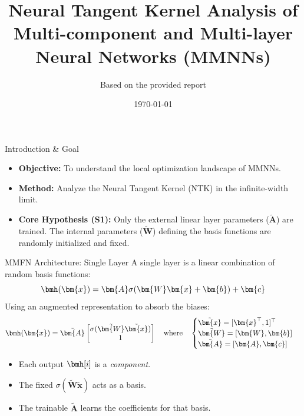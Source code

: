 \documentclass{beamer}
\title{Neural Tangent Kernel Analysis of Multi-component and Multi-layer Neural Networks (MMNNs)}
\author{Based on the provided report}
\date{\today}
\begin{document}
\begin{frame}
\titlepage
\end{frame}

\begin{frame}{Introduction \& Goal}
\begin{itemize}
    \item \textbf{Objective:} To understand the local optimization landscape of MMNNs.
    \item \textbf{Method:} Analyze the Neural Tangent Kernel (NTK) in the infinite-width limit.
    \item \textbf{Core Hypothesis (S1):} Only the external linear layer parameters ($\tilde{\bm{A}}$) are trained. The internal parameters ($\tilde{\bm{W}}$) defining the basis functions are randomly initialized and fixed.
\end{itemize}
\end{frame}

\begin{frame}{MMFN Architecture: Single Layer}
A single layer is a linear combination of random basis functions:
\begin{equation*}
    \bmh(\bm{x}) = \bm{A} \sigma(\bm{W}\bm{x} + \bm{b}) + \bm{c}
\end{equation*}
\vspace{1em}
Using an augmented representation to absorb the biases:
\begin{equation*}
    \bmh(\bm{x}) = \tilde{\bm{A}}
    \begin{bmatrix}
        \sigma(\tilde{\bm{W}}\tilde{\bm{x}}) \\
        1
    \end{bmatrix}
    \quad \text{where} \quad
    \begin{cases}
      \tilde{\bm{x}} = [\bm{x}^{\top}, 1]^{\top} \\
      \tilde{\bm{W}} = [\bm{W}, \bm{b}] \\
      \tilde{\bm{A}} = [\bm{A}, \bm{c}]
    \end{cases}
\end{equation*}
\begin{itemize}
    \item Each output $\bmh[i]$ is a \textit{component}.
    \item The fixed $\sigma(\tilde{\bm{W}}\tilde{\bm{x}})$ acts as a basis.
    \item The trainable $\tilde{\bm{A}}$ learns the coefficients for that basis.
\end{itemize}
\end{frame}
\end{document}
